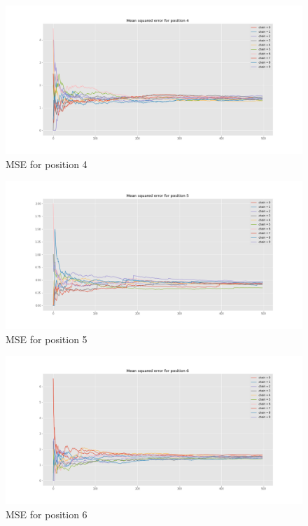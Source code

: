 \documentclass[]{article}
\begin{document}
	\begin{figure}[H]
		\begin{center}
			
			\includegraphics[width=1\textwidth]{task4/figures/T_2_4/Q2/mse_pos4.png}
			\caption*{MSE for position 4}
		\end{center}
	\end{figure}
	
	\begin{figure}[H]
		\begin{center}
			
			\includegraphics[width=1\textwidth]{task4/figures/T_2_4/Q2/mse_pos5.png}
			\caption*{MSE for position 5}
		\end{center}
	\end{figure}
	
	\begin{figure}[H]
		\begin{center}
			
			\includegraphics[width=1\textwidth]{task4/figures/T_2_4/Q2/mse_pos6.png}
			\caption*{MSE for position 6}
		\end{center}
	\end{figure}
	
\end{document}
